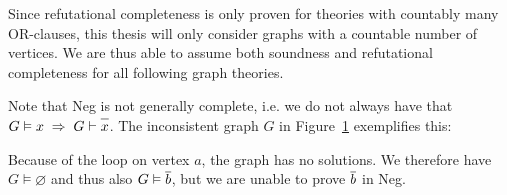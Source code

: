 Since refutational completeness is only proven for theories with countably many OR-clauses, this thesis will only consider graphs with a countable number of vertices.
We are thus able to assume both soundness and refutational completeness for all following graph theories.

Note that Neg is not generally complete, i.e. we do not always have that $G\vDash {x} \; \Rightarrow \; G \vdash \ol{x}$.
The inconsistent graph $G$ in Figure~\ref{fig:neg_not_complete} exemplifies this:\par
\begin{figure}[!h]
  \centering
  \caption{}
  \label{fig:neg_not_complete}
\end{figure}
\FloatBarrier
Because of the loop on vertex $a$, the graph has no solutions.
We therefore have $G \vDash \varnothing$ and thus also $G \vDash \ol{b}$, but we are unable to prove $\ol{b}$ in Neg.

